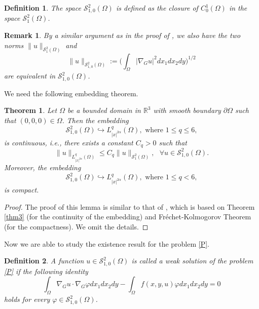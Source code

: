 \documentclass[10pt, reqno]{amsart}
\newtheorem{theorem}{Theorem}
\newtheorem{definition}{Definition}
\newtheorem{remark}{Remark}
\begin{document}
	\begin{definition}\label{def9}
		The space $\mathcal{S}^2_{1,0}(\Omega)$ is defined as the closure of $C^1_0 (\Omega)$ in the space $\mathcal{S}^2_1 (\Omega)$.
	\end{definition}
	
	\begin{remark}\label{rem4}
		By a similar argument as in the proof of \cite[Theorem 6]{Tri3}, we also have the two norms $\|u\|_{\mathcal{S}^2_1 (\Omega)}$ and
		$$\|u\|_{\mathcal{S}^2_{1,0}(\Omega)} := \bigg( \int_\Omega |\nabla_G u|^2 dx_1dx_2dy\bigg)^{1/2}$$
		are equivalent in $\mathcal{S}^2_{1,0}(\Omega)$.
	\end{remark}
	
	We need the following embedding theorem.	
	\begin{theorem}\label{thm6}
		Let $\Omega$ be a bounded domain in $\mathbb{R}^3$ with smooth boundary $\partial \Omega$ such that $(0,0,0) \in \Omega$. Then the embedding
		$$\mathcal{S}^2_{1,0} (\Omega) \hookrightarrow L^q_{|x|^{2\alpha}} (\Omega), \textrm{ where } 1\leq q \leq 6,$$
		is continuous, i.e., there exists a constant $C_q > 0$ such that 
		$$ \|u\|_{L^q_{|x|^{2\alpha}}(\Omega)} \leq C_q \|u\|_{\mathcal{S}^2_1(\Omega)}, \textrm{ } \forall u \in \mathcal{S}^2_{1,0} (\Omega).$$
		Moreover, the embedding
		$$\mathcal{S}^2_{1,0} (\Omega) \hookrightarrow L^q_{|x|^{2\alpha}} (\Omega), \textrm{ where } 1\leq q < 6,$$
		is compact.
	\end{theorem}
	
	\begin{proof}
		The proof of this lemma is similar to that of \cite[Theorem 3.2]{Luyen2}, which is based on Theorem \ref{thm3} (for the continuity of the embedding) and Fr\'echet-Kolmogorov Theorem (for the compactness). We omit the details.
	\end{proof}
	
	Now we are able to study the existence result for the problem \eqref{P}. 
	
	\begin{definition}\label{def10}
		A function $u \in \mathcal{S}^2_{1,0} (\Omega)$ is called a weak solution of the problem \eqref{P} if the following identity
		$$ \int_\Omega \nabla_G u \cdot \nabla_G \varphi dx_1dx_2dy - \int_\Omega f(x,y,u)\varphi dx_1dx_2dy = 0$$
		holds for every $\varphi \in \mathcal{S}^2_{1,0}(\Omega)$.
	\end{definition}
	
\end{document}
